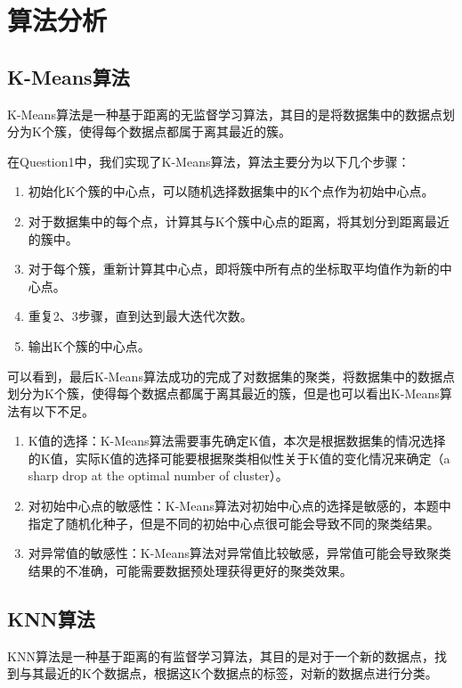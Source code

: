 \documentclass[UTF8]{ctexart}
\begin{document}
\section{算法分析}

\subsection{K-Means算法}

\indent K-Means算法是一种基于距离的无监督学习算法，其目的是将数据集中的数据点划分为K个簇，使得每个数据点都属于离其最近的簇。

\indent 在Question1中，我们实现了K-Means算法，算法主要分为以下几个步骤：

\begin{enumerate}
    \item 初始化K个簇的中心点，可以随机选择数据集中的K个点作为初始中心点。
    \item 对于数据集中的每个点，计算其与K个簇中心点的距离，将其划分到距离最近的簇中。
    \item 对于每个簇，重新计算其中心点，即将簇中所有点的坐标取平均值作为新的中心点。
    \item 重复2、3步骤，直到达到最大迭代次数。
    \item 输出K个簇的中心点。
\end{enumerate}

\indent 可以看到，最后K-Means算法成功的完成了对数据集的聚类，将数据集中的数据点划分为K个簇，使得每个数据点都属于离其最近的簇，但是也可以看出K-Means算法有以下不足。

\begin{enumerate}
    \item K值的选择：K-Means算法需要事先确定K值，本次是根据数据集的情况选择的K值，实际K值的选择可能要根据聚类相似性关于K值的变化情况来确定（a sharp drop at the optimal number of cluster）。
    \item 对初始中心点的敏感性：K-Means算法对初始中心点的选择是敏感的，本题中指定了随机化种子，但是不同的初始中心点很可能会导致不同的聚类结果。
    \item 对异常值的敏感性：K-Means算法对异常值比较敏感，异常值可能会导致聚类结果的不准确，可能需要数据预处理获得更好的聚类效果。
\end{enumerate}

\subsection{KNN算法}

\indent KNN算法是一种基于距离的有监督学习算法，其目的是对于一个新的数据点，找到与其最近的K个数据点，根据这K个数据点的标签，对新的数据点进行分类。
\end{document}
